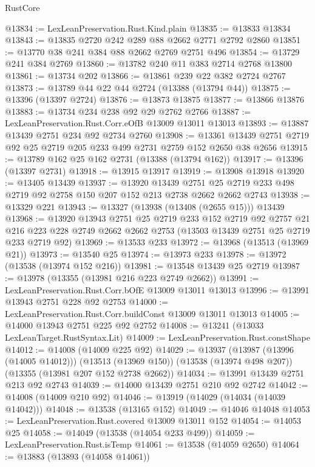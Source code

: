 \begin{lexlean}{RustCore}
\begin{coremodule}
@13834 := LexLeanPreservation.Rust.Kind.plain
@13835 := @13833 @13834
@13843 := @13835 @2720 @242 @289 @88 @2662 @2771 @2792 @2860
@13851 := @13770 @38 @241 @384 @88 @2662 @2769 @2751 @496
@13854 := @13729 @241 @384 @2769
@13860 := @13782 @240 @11 @383 @2714 @2768 @13800
@13861 := @13734 @202
@13866 := @13861 @239 @22 @382 @2724 @2767
@13873 := @13789 @44 @22 @44 @2724 (@13388 (@13794 @44))
@13875 := @13396 (@13397 @2724)
@13876 := @13873 @13875
@13877 := @13866 @13876
@13883 := @13734 @234 @238 @92 @29 @2762 @2766
@13887 := LexLeanPreservation.Rust.Corr.eOfB @13009 @13011 @13013
@13893 := @13887 @13439 @2751 @234 @92 @2734 @2760
@13908 := @13361 @13439 @2751 @2719 @92 @25 @2719 @205 @233 @499 @2731 @2759 @152 @2650 @38 @2656
@13915 := @13789 @162 @25 @162 @2731 (@13388 (@13794 @162))
@13917 := @13396 (@13397 @2731)
@13918 := @13915 @13917
@13919 := @13908 @13918
@13920 := @13405 @13439
@13937 := @13920
    @13439
    @2751
    @25
    @2719
    @233
    @498
    @2719
    @92
    @2758
    @150
    @207
    @152
    @213
    @2738
    @2662
    @2662
    @2743
@13938 := @13329 @221
@13943 := @13327 (@13938 (@13408 (@2655 @15))) @13439
@13968 := @13920
    @13943
    @2751
    @25
    @2719
    @233
    @152
    @2719
    @92
    @2757
    @21
    @216
    @223
    @228
    @2749
    @2662
    @2662
    @2753
    (@13503 @13439 @2751 @25 @2719 @233 @2719 @92)
@13969 := @13533 @233
@13972 := @13968 (@13513 (@13969 @21))
@13973 := @13540 @25
@13974 := @13973 @233
@13978 := @13972 (@13538 (@13974 @152 @216))
@13981 := @13548 @13439 @25 @2719
@13987 := @13978 (@13355 (@13981 @216 @223 @2749 @2662))
@13991 := LexLeanPreservation.Rust.Corr.bOfE @13009 @13011 @13013
@13996 := @13991 @13943 @2751 @228 @92 @2753
@14000 := LexLeanPreservation.Rust.Corr.buildConst @13009 @13011 @13013
@14005 := @14000 @13943 @2751 @225 @92 @2752
@14008 := @13241 (@13033 LexLeanTarget.RustSyntax.Lit)
@14009 := LexLeanPreservation.Rust.constShape
@14012 := @14008 (@14009 @225 @92)
@14029 := @13937
    (@13987 (@13996 (@14005 @14012)))
    (@13513 (@13969 @150))
    (@13538 (@13974 @498 @207))
    (@13355 (@13981 @207 @152 @2738 @2662))
@14034 := @13991 @13439 @2751 @213 @92 @2743
@14039 := @14000 @13439 @2751 @210 @92 @2742
@14042 := @14008 (@14009 @210 @92)
@14046 := @13919 (@14029 (@14034 (@14039 @14042)))
@14048 := @13538 (@13165 @152)
@14049 := @14046 @14048
@14053 := LexLeanPreservation.Rust.covered @13009 @13011 @152
@14054 := @14053 @25
@14058 := @14049 (@13538 (@14054 @233 @499))
@14059 := LexLeanPreservation.Rust.isTemp
@14061 := @13538 (@14059 @2650)
@14064 := @13883 (@13893 (@14058 @14061))

\end{coremodule}
\end{lexlean}
